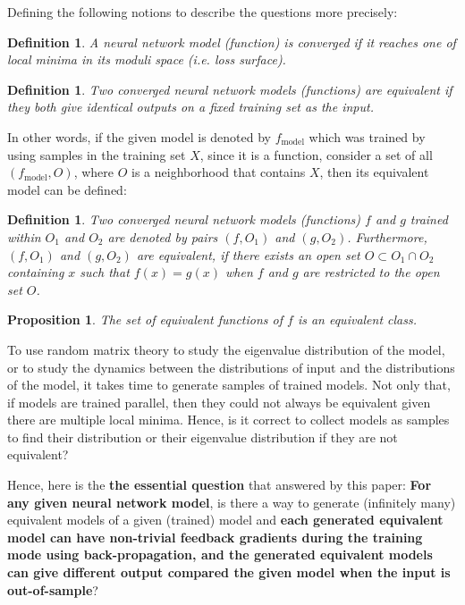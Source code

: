 \documentclass{article}
\theoremstyle{plain}
\theoremstyle{plain} %
\newtheorem{proposition}{Proposition}
\newtheorem{definition}[theorem]{Definition}
\theoremstyle{definition}  %
\theoremstyle{remark}  %
\theoremstyle{plain}
\begin{document}
Defining the following notions to describe the questions more precisely:
\begin{definition}
\textit{A neural network model (function) is converged} if it reaches one of local minima in its moduli space (i.e. loss surface).
\end{definition}

\begin{definition}
\textit{Two converged neural network models (functions) are equivalent} if they both give identical outputs on a fixed training set as the input.
\end{definition}

In other words, if the given model is denoted by $f_{\text{model}}$ which was trained by using samples in the training set $X$, since it is a function, consider a set of all $(f_{\text{model}},O)$, where $O$ is a neighborhood that contains $X$, then its equivalent model can be defined:
\begin{definition}
Two converged neural network models (functions) $f$ and $g$ trained within $O_1$ and $O_2$ are denoted by pairs $(f,O_1)$ and $(g,O_2)$. Furthermore, $(f,O_1)$ and $(g,O_2)$ are equivalent, if there exists an open set $O\subset O_1 \cap O_2$ containing $x$ such that $f(x)=g(x)$ when $f$ and $g$ are restricted to the open set $O$.
\end{definition}
\begin{proposition}\cite{tu2011manifolds}
The set of equivalent functions of $f$ is an equivalent class.
\end{proposition}


To use random matrix theory\cite{louart2018random, pennington2017geometry, seddik2020random} to study the eigenvalue distribution of the model, or to study the dynamics between the distributions of input and the distributions of the model, it takes time to generate samples of trained models. Not only that, if models are trained parallel, then they could not always be equivalent given there are multiple local minima. Hence, is it correct to collect models as samples to find their distribution or their eigenvalue distribution if they are not equivalent?

Hence, here is the \textbf{the essential question} that answered by this paper: \textbf{For any given neural network model}, is there a way to generate (infinitely many) equivalent models of a given (trained) model and \textbf{each generated equivalent model can have non-trivial feedback gradients during the training mode using back-propagation, and the generated equivalent models can give different output compared the given model when the input is out-of-sample}?
\end{document}
